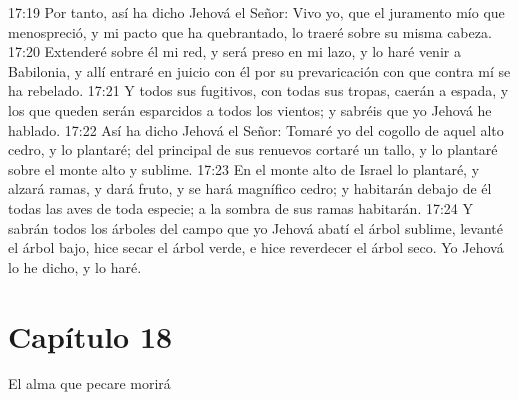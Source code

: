 17:19 Por tanto, así ha dicho Jehová el Señor: Vivo yo, que el juramento mío que menospreció, y mi pacto que ha quebrantado, lo traeré sobre su misma cabeza.   
17:20 Extenderé sobre él mi red, y será preso en mi lazo, y lo haré venir a Babilonia, y allí entraré en juicio con él por su prevaricación con que contra mí se ha rebelado.   
17:21 Y todos sus fugitivos, con todas sus tropas, caerán a espada, y los que queden serán esparcidos a todos los vientos; y sabréis que yo Jehová he hablado.   
17:22 Así ha dicho Jehová el Señor: Tomaré yo del cogollo de aquel alto cedro, y lo plantaré; del principal de sus renuevos cortaré un tallo, y lo plantaré sobre el monte alto y sublime.   
17:23 En el monte alto de Israel lo plantaré, y alzará ramas, y dará fruto, y se hará magnífico cedro; y habitarán debajo de él todas las aves de toda especie; a la sombra de sus ramas habitarán.   
17:24 Y sabrán todos los árboles del campo que yo Jehová abatí el árbol sublime, levanté el árbol bajo, hice secar el árbol verde, e hice reverdecer el árbol seco. Yo Jehová lo he dicho, y lo haré.   
\section*{Capítulo 18 } 
El alma que pecare morirá   
  
